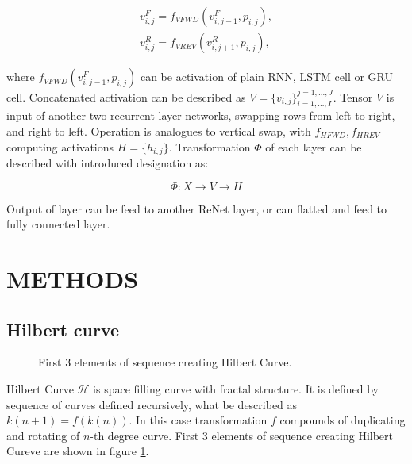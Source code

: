 \documentclass[a4paper, 10 pt, conference]{ieeeconf}
\begin{document}
\begin{gather}
	v_{i,j}^{F} = f_{VFWD} (v_{i,j-1}^F, p_{i,j}), \\
    v_{i,j}^{R} = f_{VREV} (v_{i,j+1}^R, p_{i,j}),
\end{gather}

where $f_{VFWD} (v_{i,j-1}^F, p_{i,j})$ can be activation of plain RNN, LSTM cell or GRU cell. Concatenated activation can be described as $V = \{v_{i,j}\}_{i=1,...,I}^{j=1,...,J}$. Tensor $V$ is input of another two recurrent layer networks, swapping rows from left to right, and right to left. Operation is analogues to vertical swap, with $f_{HFWD}, f_{HREV}$ computing activations $H = \{h_{i,j}\}$. Transformation $\Phi$ of each layer can be described with introduced designation as:

\begin{equation}
	\Phi: X \rightarrow V \rightarrow H
\end{equation}

Output of layer can be feed to another ReNet layer, or can flatted and feed to fully connected layer.

\section{METHODS}

\subsection{Hilbert curve}

\begin{figure}
	\centering
\caption{First 3 elements of sequence creating Hilbert Curve.}
	\label{fig:hilbert}
\end{figure}

Hilbert Curve $\mathcal{H}$ is space filling curve with fractal structure. It is defined by sequence of curves defined recursively, what be described as $k(n+1) = f(k(n))$. In this case transformation $f$ compounds of duplicating and rotating of $n$-th degree curve. First 3 elements of sequence creating Hilbert Cureve are shown in figure \ref{fig:hilbert}.
\end{document}
